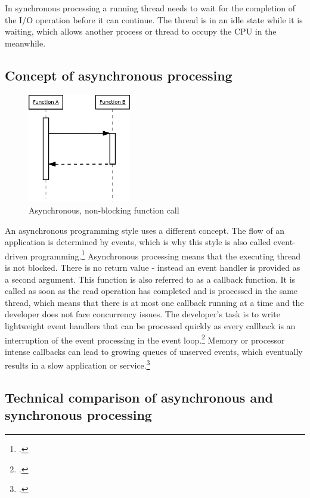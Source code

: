 In synchronous processing a running thread needs to wait for the completion of
the I/O operation before it can continue.
The thread is in an idle state while it is waiting, which allows another process 
or thread to occupy the CPU in the meanwhile.
\FloatBarrier
\subsection{Concept of asynchronous processing}
\label{concept_async}
\FloatBarrier

\begin{figure}[hbtp]
\centering
\includegraphics[width=0.4\textwidth]{img/asynch_call.png}
\caption{Asynchronous, non-blocking function call}
\label{fig:asynch_call}
\end{figure}

An asynchronous programming style uses a different concept. The flow of an
application is determined by events, which is why this style is also called
event-driven programming.\footcite[Cf.][16]{teixeira_2012} Asynchronous processing means
that the executing thread is not blocked. There is no
return value - instead an event handler is provided as a second argument.
This function is also referred to as a callback function. It is called as soon
as the read operation has completed and is processed in the same thread, which
means that there is at most one callback running at a time and the developer
does not face concurrency issues.
The developer’s task is to write lightweight event handlers that can be
processed quickly as every callback is an interruption of the event processing
in the event loop.\footcite[Cf.][]{Croucher_2012} Memory or processor intense
callbacks can lead to growing queues of unserved events, which eventually
results in a slow application or service.\footcite[Cf.][48]{teixeira_2012}


\subsection{Technical comparison of asynchronous and synchronous processing}
\label{comparison_syncasync}

